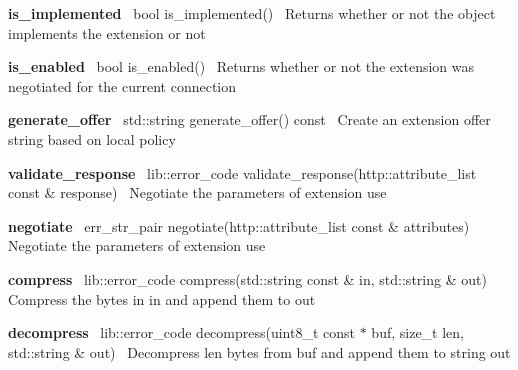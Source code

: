 {\bfseries is\+\_\+implemented}~\newline
{\ttfamily bool is\+\_\+implemented()}~\newline
Returns whether or not the object implements the extension or not

{\bfseries is\+\_\+enabled}~\newline
{\ttfamily bool is\+\_\+enabled()}~\newline
Returns whether or not the extension was negotiated for the current connection

{\bfseries generate\+\_\+offer}~\newline
{\ttfamily std\+::string generate\+\_\+offer() const}~\newline
Create an extension offer string based on local policy

{\bfseries validate\+\_\+response}~\newline
{\ttfamily lib\+::error\+\_\+code validate\+\_\+response(http\+::attribute\+\_\+list const \& response)}~\newline
Negotiate the parameters of extension use

{\bfseries negotiate}~\newline
{\ttfamily err\+\_\+str\+\_\+pair negotiate(http\+::attribute\+\_\+list const \& attributes)}~\newline
Negotiate the parameters of extension use

{\bfseries compress}~\newline
{\ttfamily lib\+::error\+\_\+code compress(std\+::string const \& in, std\+::string \& out)}~\newline
Compress the bytes in {\ttfamily in} and append them to {\ttfamily out}

{\bfseries decompress}~\newline
{\ttfamily lib\+::error\+\_\+code decompress(uint8\+\_\+t const $\ast$ buf, size\+\_\+t len, std\+::string \& out)}~\newline
Decompress {\ttfamily len} bytes from {\ttfamily buf} and append them to string {\ttfamily out} 